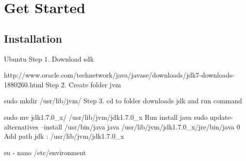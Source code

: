 \chapter{Get Started}

\section{Installation}

Ubuntu
Step 1. Download sdk

http://www.oracle.com/technetwork/java/javase/downloads/jdk7-downloads-1880260.html
Step 2. Create folder jvm

sudo mkdir /usr/lib/jvm/
Step 3. cd to folder downloads jdk and run command

sudo mv jdk1.7.0_x/ /usr/lib/jvm/jdk1.7.0_x
Run install java
sudo update-alternatives --install /usr/bin/java java /usr/lib/jvm/jdk1.7.0_x/jre/bin/java 0
Add path jdk : /usr/lib/jvm/jdk1.7.0_x

su -
nano /etc/environment
